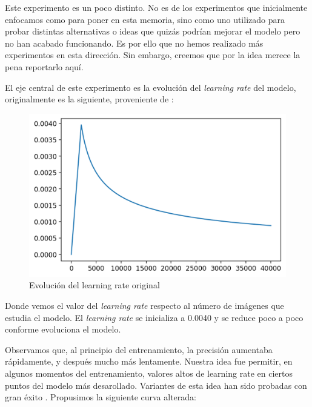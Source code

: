 \documentclass[a4paper, 20pt, dvipsnames]{article}
\begin{document}
Este experimento es un poco distinto. No es de los experimentos que inicialmente
enfocamos como para poner en esta memoria, sino como uno utilizado para probar
distintas alternativas o ideas que quizás podrían mejorar el modelo pero no han
acabado funcionando. Es por ello que no hemos realizado más experimentos en esta
dirección. Sin embargo, creemos que por la idea merece la pena reportarlo aquí.

El eje central de este experimento es la evolución del \emph{learning rate} del
modelo, originalmente es la siguiente, proveniente de
\cite{vaswani2017attention}:

\begin{figure}[H]
	\centering
	\includegraphics[scale=0.5]{fig/learning-rate}
	\caption{Evolución del learning rate original}
\end{figure}

Donde vemos el valor del \emph{learning rate} respecto al número de imágenes que
estudia el modelo. El \emph{learning rate} se inicializa a 0.0040 y se reduce poco
a poco conforme evoluciona el modelo.

Observamos que, al principio del entrenamiento, la precisión aumentaba
rápidamente, y después mucho más lentamente. Nuestra idea fue permitir, en
algunos momentos del entrenamiento, valores altos de learning rate en ciertos
puntos del modelo más desarollado. Variantes de esta idea han sido probadas con
gran éxito \cite{smith2018superconvergence}. Propusimos la siguiente curva
alterada:
\end{document}
